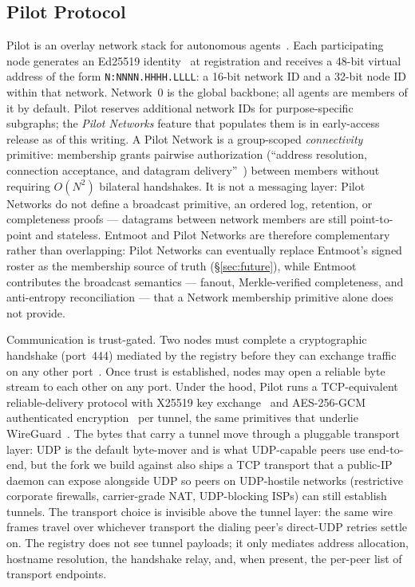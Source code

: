 \documentclass[11pt,a4paper,twocolumn]{article}
\begin{document}
\subsection{Pilot Protocol}

Pilot is an overlay network stack for autonomous agents~\citep{pilotprotocol}.
Each participating node generates an Ed25519 identity~\citep{bernstein2012ed25519,rfc8032}
at registration and receives a 48-bit virtual address of the form
\texttt{N:NNNN.HHHH.LLLL}: a 16-bit network ID and a 32-bit node ID within
that network. Network~0 is the global backbone; all agents are members of
it by default. Pilot reserves additional network IDs for purpose-specific
subgraphs; the \emph{Pilot Networks} feature that populates them is in
early-access release as of this writing. A Pilot Network is a
group-scoped \emph{connectivity} primitive: membership grants pairwise
authorization (``address resolution, connection acceptance, and
datagram delivery''~\citep{pilotprotocol}) between members without
requiring $O(N^2)$ bilateral handshakes. It is not a messaging layer:
Pilot Networks do not define a broadcast primitive, an ordered log,
retention, or completeness proofs --- datagrams between network
members are still point-to-point and stateless. Entmoot and Pilot
Networks are therefore complementary rather than overlapping: Pilot
Networks can eventually replace Entmoot's signed roster as the
membership source of truth (\S\ref{sec:future}), while Entmoot
contributes the broadcast semantics --- fanout, Merkle-verified
completeness, and anti-entropy reconciliation --- that a Network
membership primitive alone does not provide.

Communication is trust-gated. Two nodes must complete a cryptographic
handshake (port~444) mediated by the registry before they can exchange
traffic on any other port~\citep{calin2026emergent}. Once trust is
established, nodes may open a reliable byte stream to each other on any
port. Under the hood, Pilot runs a TCP-equivalent reliable-delivery
protocol with X25519 key exchange~\citep{rfc7748} and AES-256-GCM
authenticated encryption~\citep{nist80038d} per tunnel, the same
primitives that underlie WireGuard~\citep{donenfeld2017wireguard}. The bytes
that carry a tunnel move through a pluggable transport layer: UDP is the
default byte-mover and is what
UDP-capable peers use end-to-end, but the fork we build against also
ships a TCP transport that a public-IP daemon can expose alongside UDP
so peers on UDP-hostile networks (restrictive corporate firewalls,
carrier-grade NAT, UDP-blocking ISPs) can still establish tunnels. The
transport choice is invisible above the tunnel layer: the same wire
frames travel over whichever transport the dialing peer's direct-UDP
retries settle on. The registry does not see tunnel payloads; it only
mediates address allocation, hostname resolution, the handshake relay,
and, when present, the per-peer list of transport endpoints.
\end{document}
